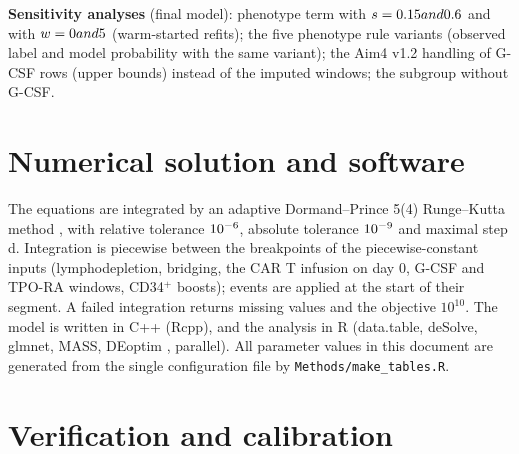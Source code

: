 \documentclass[11pt]{article}
\begin{document}
\textbf{Sensitivity analyses} (final model): phenotype term with $s=0.15 and 0.6$ and with $w=0 and 5$ (warm-started refits); the five phenotype rule variants (observed label and model probability with the same variant); the Aim4 v1.2 handling of G-CSF rows (upper bounds) instead of the imputed windows; the subgroup without G-CSF.

\section{Numerical solution and software}
The equations are integrated by an adaptive Dormand--Prince 5(4) Runge--Kutta method \citep{dormand1980}, with relative tolerance $10^{-6}$, absolute tolerance $10^{-9}$ and maximal step \valHmax{} d. Integration is piecewise between the breakpoints of the piecewise-constant inputs (lymphodepletion, bridging, the CAR T infusion on day 0, G-CSF and TPO-RA windows, CD34$^+$ boosts); events are applied at the start of their segment. A failed integration returns missing values and the objective $10^{10}$. The model is written in C++ (Rcpp), and the analysis in R \valRVersion{} (data.table, deSolve, glmnet, MASS, DEoptim \valDEoptim, parallel). All parameter values in this document are generated from the single configuration file by \texttt{Methods/make\_tables.R}.

\section{Verification and calibration}\label{sec:calibration}
\end{document}
